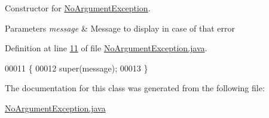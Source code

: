 Constructor for \hyperlink{classNoArgumentException}{No\-Argument\-Exception}. 


\begin{DoxyParams}{Parameters}
{\em message} & Message to display in case of that error \\
\hline
\end{DoxyParams}


Definition at line \hyperlink{NoArgumentException_8java_source_l00011}{11} of file \hyperlink{NoArgumentException_8java_source}{No\-Argument\-Exception.\-java}.


\begin{DoxyCode}
00011                                               \{
00012         super(message);
00013     \}
\end{DoxyCode}


The documentation for this class was generated from the following file\-:\begin{DoxyCompactItemize}
\item 
\hyperlink{NoArgumentException_8java}{No\-Argument\-Exception.\-java}\end{DoxyCompactItemize}
